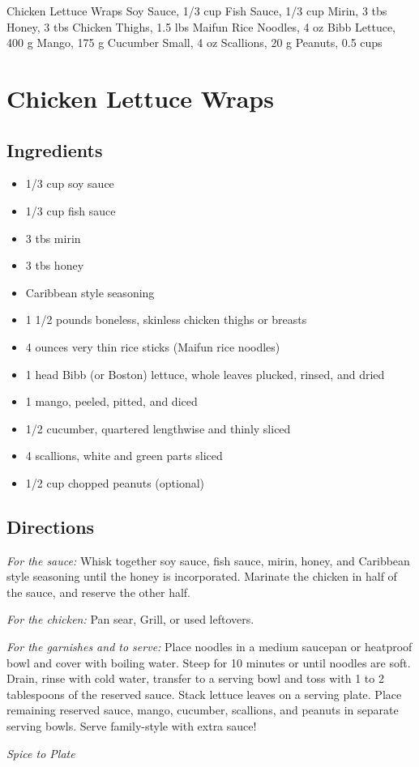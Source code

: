 Chicken Lettuce Wraps
  Soy Sauce, 1/3 cup
  Fish Sauce, 1/3 cup
  Mirin, 3 tbs
  Honey, 3 tbs
  Chicken Thighs, 1.5 lbs
  Maifun Rice Noodles, 4 oz
  Bibb Lettuce, 400 g
  Mango, 175 g
  Cucumber Small, 4 oz
  Scallions, 20 g
  Peanuts, 0.5 cups
\section{ Chicken Lettuce Wraps }

\subsection{ Ingredients }

\begin{itemize}
  \item 1/3 cup soy sauce
  \item 1/3 cup fish sauce
  \item 3 tbs mirin
  \item 3 tbs honey
  \item Caribbean style seasoning
  \item 1 1/2 pounds boneless, skinless chicken thighs or breasts
  \item 4 ounces very thin rice sticks (Maifun rice noodles)
  \item 1 head Bibb (or Boston) lettuce, whole leaves plucked, rinsed, and dried
  \item 1 mango, peeled, pitted, and diced
  \item 1/2 cucumber, quartered lengthwise and thinly sliced
  \item 4 scallions, white and green parts sliced
  \item 1/2 cup chopped peanuts (optional)
\end{itemize}

\subsection{ Directions }

  \textit{For the sauce:} Whisk together soy sauce, fish sauce, mirin, honey, and Caribbean style seasoning until the honey is incorporated. Marinate the chicken in half of the sauce, and reserve the other half. 

  \textit{For the chicken:} Pan sear, Grill, or used leftovers.

  \textit{For the garnishes and to serve:} Place noodles in a medium saucepan or heatproof bowl and cover with boiling water. Steep for 10 minutes or until noodles are soft. Drain, rinse with cold water, transfer to a serving bowl and toss with 1 to 2 tablespoons of the reserved sauce. Stack lettuce leaves on a serving plate. Place remaining reserved sauce, mango, cucumber, scallions, and peanuts in separate serving bowls. Serve family-style with extra sauce!

\textit{Spice to Plate}
